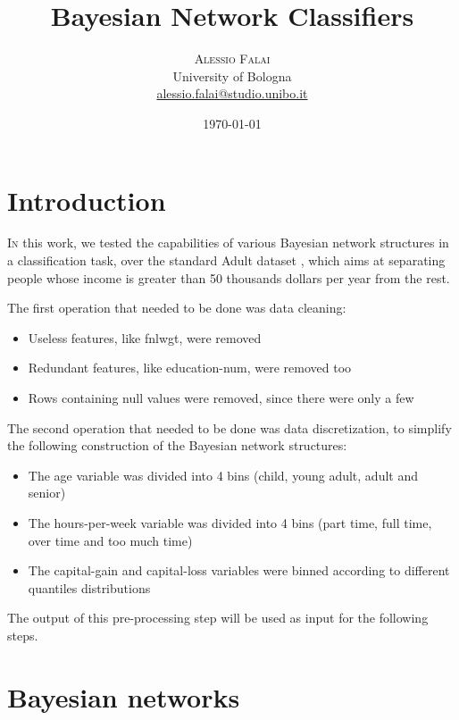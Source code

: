 \documentclass[twoside,twocolumn]{article}
\title{Bayesian Network Classifiers} %
\author{%
\textsc{Alessio Falai} \\[1ex] %
\normalsize University of Bologna \\ %
\normalsize \href{mailto:alessio.falai@studio.unibo.it}{alessio.falai@studio.unibo.it} %
}
\date{\today} %
\begin{document}
\maketitle


\section{Introduction}

\lettrine[nindent=0em,lines=3]{I}n this work, we tested the capabilities of various Bayesian network structures in a classification task, 
over the standard Adult dataset \cite{bib:uci}, which aims at separating people whose income is greater than 50 thousands dollars per year from the rest.

The first operation that needed to be done was data cleaning: 
\begin{itemize}
  \item Useless features, like fnlwgt, were removed
  \item Redundant features, like education-num, were removed too
  \item Rows containing null values were removed, since there were only a few
\end{itemize}

The second operation that needed to be done was data discretization, to simplify the following construction of the Bayesian network structures:
\begin{itemize}
  \item The age variable was divided into 4 bins (child, young adult, adult and senior)
  \item The hours-per-week variable was divided into 4 bins (part time, full time, over time and too much time)
  \item The capital-gain and capital-loss variables were binned according to different quantiles distributions
\end{itemize}

The output of this pre-processing step will be used as input for the following steps. 


\section{Bayesian networks}
\end{document}
